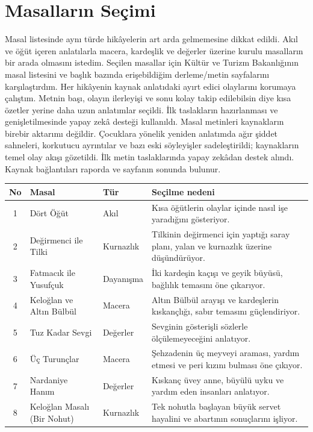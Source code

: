 \documentclass[12pt,a4paper]{article}
\begin{document}
\section{Masalların Seçimi}
Masal listesinde aynı türde hikâyelerin art arda gelmemesine dikkat edildi. Akıl ve öğüt içeren anlatılarla macera, kardeşlik ve değerler üzerine kurulu masalların bir arada olmasını istedim. Seçilen masallar için Kültür ve Turizm Bakanlığının masal listesini ve başlık bazında erişebildiğim derleme/metin sayfalarını karşılaştırdım. Her hikâyenin kaynak anlatıdaki ayırt edici olaylarını korumaya çalıştım. Metnin başı, olayın ilerleyişi ve sonu kolay takip edilebilsin diye kısa özetler yerine daha uzun anlatımlar seçildi. İlk taslakların hazırlanması ve genişletilmesinde yapay zekâ desteği kullanıldı. Masal metinleri kaynakların birebir aktarımı değildir. Çocuklara yönelik yeniden anlatımda ağır şiddet sahneleri, korkutucu ayrıntılar ve bazı eski söyleyişler sadeleştirildi; kaynakların temel olay akışı gözetildi. İlk metin taslaklarında yapay zekâdan destek alındı. Kaynak bağlantıları raporda ve sayfanın sonunda bulunur.

\begin{longtable}{@{}cp{4cm}p{2.4cm}p{5.2cm}@{}}
\toprule
\textbf{No} & \textbf{Masal} & \textbf{Tür} & \textbf{Seçilme nedeni} \\
\midrule
\endhead
1 & Dört Öğüt & Akıl & Kısa öğütlerin olaylar içinde nasıl işe yaradığını gösteriyor. \\
2 & Değirmenci ile Tilki & Kurnazlık & Tilkinin değirmenci için yaptığı saray planı, yalan ve kurnazlık üzerine düşündürüyor. \\
3 & Fatmacık ile Yusufçuk & Dayanışma & İki kardeşin kaçışı ve geyik büyüsü, bağlılık temasını öne çıkarıyor. \\
4 & Keloğlan ve Altın Bülbül & Macera & Altın Bülbül arayışı ve kardeşlerin kıskançlığı, sabır temasını güçlendiriyor. \\
5 & Tuz Kadar Sevgi & Değerler & Sevginin gösterişli sözlerle ölçülemeyeceğini anlatıyor. \\
6 & Üç Turunçlar & Macera & Şehzadenin üç meyveyi araması, yardım etmesi ve peri kızını bulması öne çıkıyor. \\
7 & Nardaniye Hanım & Değerler & Kıskanç üvey anne, büyülü uyku ve yardım eden insanları anlatıyor. \\
8 & Keloğlan Masalı (Bir Nohut) & Kurnazlık & Tek nohutla başlayan büyük servet hayalini ve abartının sonuçlarını işliyor. \\
\bottomrule
\end{longtable}
\end{document}
